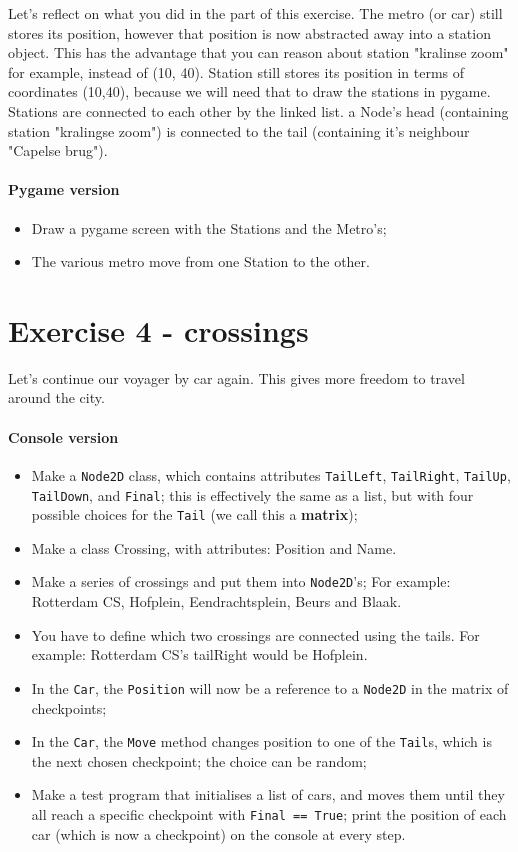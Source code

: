 \documentclass[12pt,a4paper]{article}
\begin{document}
		    Let's reflect on what you did in the part of this exercise.
		    The metro (or car) still stores its position, however that position is now abstracted away into a station object.
		    This has the advantage that you can reason about station "kralinse zoom" for example, instead of (10, 40).
		    Station still stores its position in terms of coordinates (10,40), because we will need that to draw the stations in pygame.
		    Stations are connected to each other by the linked list. a Node's head (containing station "kralingse zoom") is connected to the tail (containing it's neighbour "Capelse brug").


		\paragraph*{Pygame version}
			\begin{itemize}
				\item Draw a pygame screen with the Stations and the Metro's;
				\item The various metro move from one Station to the other.
			\end{itemize}

	\section{Exercise 4 - crossings}
	    Let's continue our voyager by car again. This gives more freedom to travel around the city.
		\paragraph*{Console version}
			\begin{itemize}
				\item Make a \texttt{Node2D} class,
				        which contains attributes
				            \texttt{TailLeft}, \texttt{TailRight}, \texttt{TailUp}, \texttt{TailDown}, and \texttt{Final};
				        this is effectively the same as a list,
				        but with four possible choices for the \texttt{Tail} (we call this a \textbf{matrix});
				\item Make a class Crossing, with attributes: Position and Name.
				\item Make a series of crossings and put them into \texttt{Node2D}'s; For example: Rotterdam CS, Hofplein, Eendrachtsplein, Beurs and Blaak.
				\item You have to define which two crossings are connected using the tails. For example: Rotterdam CS's tailRight would be Hofplein.
				\item In the \texttt{Car}, the \texttt{Position} will now be a reference to a \texttt{Node2D} in the matrix of checkpoints;
				\item In the \texttt{Car}, the \texttt{Move} method changes position to one of the \texttt{Tail}s, which is the next chosen checkpoint; the choice can be random;
				\item Make a test program that initialises a list of cars, and moves them until they all reach a specific checkpoint with \texttt{Final == True}; print the position of each car (which is now a checkpoint) on the console at every step.
			\end{itemize}
			
\end{document}
